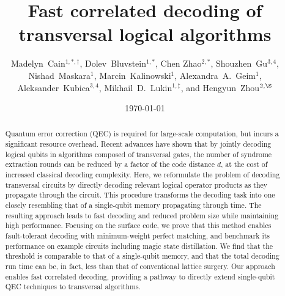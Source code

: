 \documentclass[prx,twocolumn,secnumarabic,balancelastpage,amsmath,amssymb,longbibliography]{revtex4-2}
\begin{document}
\title{Fast correlated decoding of transversal logical algorithms}

\author{
Madelyn~Cain$^{1,*,\dagger}$, 
Dolev~Bluvstein$^{1,*}$, 
Chen Zhao$^{2,*}$, 
Shouzhen~Gu$^{3, 4}$, 
Nishad~Maskara$^{1}$, 
Marcin~Kalinowski$^{1}$, 
Alexandra~A.~Geim$^{1}$, 
Aleksander~Kubica$^{3,4}$, 
Mikhail~D.~Lukin$^{1,\ddagger}$, 
and Hengyun~Zhou$^{2,\S}$
}


\date{\today}

\begin{abstract}
Quantum error correction (QEC) is required for large-scale computation, but incurs a significant resource overhead. 
%
Recent advances have shown that by jointly decoding logical qubits in algorithms composed of transversal gates, the number of syndrome extraction rounds can be reduced by a factor of the code distance $d$, at the cost of increased classical decoding complexity.
%
Here, we reformulate the problem of decoding transversal circuits by directly decoding relevant logical operator products as they propagate through the circuit.
%
This procedure transforms the decoding task into one closely resembling that of a single-qubit memory propagating through time. 
%
The resulting approach leads to fast decoding and reduced problem size while maintaining high performance. 
%
Focusing on the surface code, we prove that this method enables fault-tolerant decoding with minimum-weight perfect matching, and benchmark its performance on example circuits including magic state distillation.
%
We find that the threshold is comparable to that of a single-qubit memory, and that the total decoding run time can be, in fact, less than that of conventional lattice surgery. 
%
Our approach enables fast correlated decoding, providing a pathway to directly extend single-qubit QEC techniques to transversal algorithms.
\end{abstract}
\end{document}
